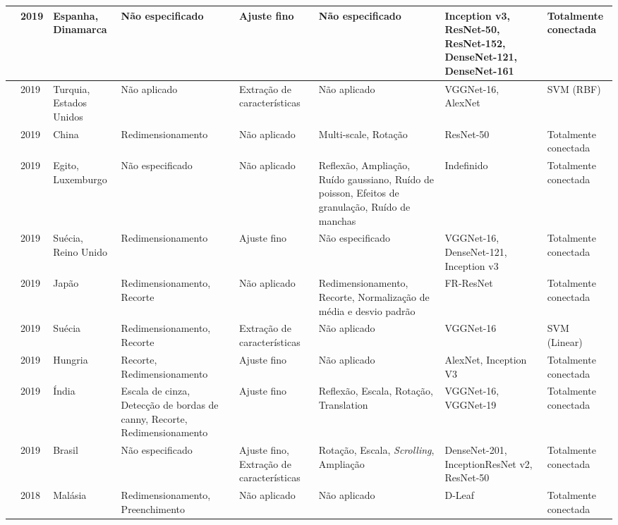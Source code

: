 \documentclass[
	12pt,				%
	oneside,			%
	a4paper,			%
	english,			%
	brazil				%
	]{abntex2ppgsi}
\begin{document}
\begin{landscape}
\begin{OnehalfSpacing}
\begin{footnotesize}
\begin{longtable}{|p{2.3cm}|p{1.3cm}|p{1.8cm}|p{3cm}|p{2.4cm}|p{4.3cm}|p{4.3cm}|p{2.5cm}|}
\cite{gomez2019coral} &
  2019 &
  Espanha, Dinamarca &
  Não especificado &
  Ajuste fino &
  Não especificado &
  Inception v3, ResNet-50, ResNet-152, DenseNet-121, DenseNet-161 &
  Totalmente conectada \\ \hline
\cite{cibuk2019efficient} &
  2019 &
  Turquia, Estados Unidos &
  Não aplicado &
  Extração de características &
  Não aplicado &
  VGGNet-16, AlexNet &
  SVM (RBF) \\ \hline
\cite{li2019effective} &
  2019 &
  China &
  Redimensionamento &
  Não aplicado &
  Multi-scale, Rotação &
  ResNet-50 &
  Totalmente conectada \\ \hline
\cite{khalifa2019deep} &
  2019 &
  Egito, Luxemburgo &
  Não especificado &
  Não aplicado &
  Reflexão, Ampliação, Ruído gaussiano, Ruído de poisson, Efeitos de granulação, Ruído de manchas &
  Indefinido &
  Totalmente conectada \\ \hline
\cite{hsiang2019endless} &
  2019 &
  Suécia, Reino Unido &
  Redimensionamento &
  Ajuste fino &
  Não especificado &
  VGGNet-16, DenseNet-121, Inception v3 &
  Totalmente conectada \\ \hline
\cite{ren2019feature} &
  2019 &
  Japão &
  Redimensionamento, Recorte &
  Não aplicado &
  Redimensionamento, Recorte, Normalização de média e desvio padrão &
  FR-ResNet &
  Totalmente conectada \\ \hline
\cite{valan2019automated} &
  2019 &
  Suécia &
  Redimensionamento, Recorte &
  Extração de características &
  Não aplicado &
  VGGNet-16 &
  SVM (Linear) \\ \hline
\cite{gyires2019deep} &
  2019 &
  Hungria &
  Recorte, Redimensionamento &
  Ajuste fino &
  Não aplicado &
  AlexNet, Inception V3 &
  Totalmente conectada \\ \hline
\cite{thenmozhi2019crop} &
  2019 &
  Índia &
  Escala de cinza, Detecção de bordas de canny, Recorte, Redimensionamento &
  Ajuste fino &
  Reflexão, Escala, Rotação, Translation &
  VGGNet-16, VGGNet-19 &
  Totalmente conectada \\ \hline
\cite{tetila2019deep} &
  2019 &
  Brasil &
  Não especificado &
  Ajuste fino, Extração de características &
  Rotação, Escala, \textit{Scrolling}, Ampliação &
  DenseNet-201, InceptionResNet v2, ResNet-50 &
  Totalmente conectada \\ \hline
\cite{wei2018deep} &
  2018 &
  Malásia &
  Redimensionamento, Preenchimento &
  Não aplicado &
  Não aplicado &
  D-Leaf &
  Totalmente conectada \\ \hline

\end{longtable}
\end{footnotesize}
\end{OnehalfSpacing}
\end{landscape}
\end{document}
